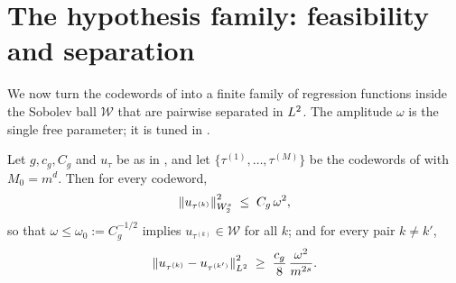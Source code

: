 \section{The hypothesis family: feasibility and separation}\label{sec:bumps}

We now turn the codewords of  into a finite family of regression
functions inside the Sobolev ball $\mathcal{W}$ that are pairwise separated in
$L^{2}$. The amplitude $\omega$ is the single free parameter; it is tuned in
.

\begin{lemma}\label{lem:bumps}
Let $g,c_g,C_g$ and $u_\tau$ be as in , and let
$\{\tau^{(1)},\dots,\tau^{(M)}\}$ be the codewords of  with
$M_0=m^d$. Then for every codeword,
\begin{align}\label{eq:sobnorm}
\left\| u_{\tau^{(k)}} \right\|_{W^{s}_{2}}^2 \;\le\; C_g\,\omega^2,
\end{align}
so that $\omega\le \omega_0 := C_g^{-1/2}$ implies $u_{\tau^{(k)}}\in\mathcal{W}$
for all $k$; and for every pair $k\ne k'$,
\begin{align}\label{eq:sep}
\left\| u_{\tau^{(k)}}-u_{\tau^{(k')}} \right\|_{L^{2}}^2
\;\ge\; \frac{c_g}{8}\,\frac{\omega^2}{m^{2s}}.
\end{align}
\end{lemma}

